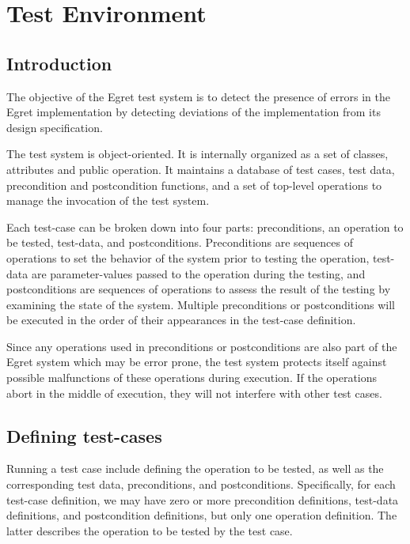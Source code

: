 \chapter{Test Environment}
\section {Introduction}

The objective of the Egret test system is to detect the presence of
errors in the Egret implementation by detecting deviations of the
implementation from its design specification.

The test system is object-oriented.  It is internally organized as a
set of classes, attributes and public operation.  It maintains a
database of test cases, test data, precondition and postcondition
functions, and a set of top-level operations to manage the invocation
of the test system.

Each test-case can be broken down into four parts: preconditions, an
operation to be tested, test-data, and postconditions.  Preconditions
are sequences of operations to set the behavior of the system prior to
testing the operation, test-data are parameter-values passed to the
operation during the testing, and postconditions are sequences of
operations to assess the result of the testing by examining the state
of the system.  Multiple preconditions or postconditions will be
executed in the order of their appearances in the test-case
definition.

Since any operations used in preconditions or postconditions are also
part of the Egret system which may be error prone, the test system
protects itself against possible malfunctions of these operations
during execution.  If the operations abort in the middle of execution,
they will not interfere with other test cases.

\section {Defining test-cases}

Running a test case include defining the operation to be tested, as
well as the corresponding test data, preconditions, and
postconditions.  Specifically, for each test-case definition, we may
have zero or more precondition definitions, test-data definitions, and
postcondition definitions, but only one operation definition.  The
latter describes the operation to be tested by the test case.

